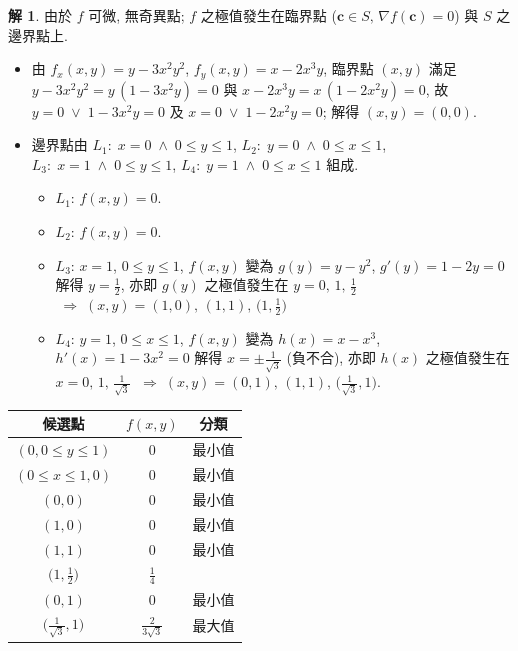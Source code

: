 \documentclass[12pt]{extarticle}
\newcommand{\ds}{\displaystyle}
\newcommand{\ie}{\;\Longrightarrow\;}
\newcommand{\orr}{\;\vee\;}
\newcommand{\andd}{\;\wedge\;}
\theoremstyle{definition}
\newtheorem*{sol}{解}
\newcommand{\vc}{\mathbf{c}}
\begin{document}
\begin{sol}
  由於 $f$ 可微, 無奇異點; $f$ 之極值發生在臨界點 ($\vc\in S,\,\nabla f(\vc) = 0$) 與 $S$ 之邊界點上. 
  \begin{itemize}\setlength\itemsep{0em}
    \item 由 $\ds f_x(x, y) = y - 3x^2y^2$, $\ds f_y(x, y) = x - 2x^3y$, 臨界點 $(x, y)$ 滿足 $\ds y - 3x^2y^2 = y\,(1 - 3x^2y) = 0$ 與 $\ds x - 2x^3y = x\,(1 - 2x^2y)= 0$, 故 $y = 0\orr 1 - 3x^2y = 0$ 及 $x = 0\orr 1 - 2x^2y = 0$; 解得 $(x, y) = (0, 0)$. 
    \item 邊界點由 $L_1:\;x = 0\andd 0\leqslant y\leqslant 1$, $L_2:\;y = 0\andd 0\leqslant x\leqslant 1$, $L_3:\;x = 1\andd 0\leqslant y\leqslant 1$, $L_4:\;y = 1\andd 0\leqslant x\leqslant 1$ 組成. 
      \begin{itemize}\setlength\itemsep{0em}
        \item $L_1$: $f(x, y) = 0$. 
        \item $L_2$: $f(x, y) = 0$. 
        \item $L_3$: $x = 1$, $0\leqslant y\leqslant1$, $f(x, y)$ 變為 $g(y) = y - y^2$, $g'(y) = 1 - 2y = 0$ 解得 $y = \frac{1}{2}$, 亦即 $g(y)$ 之極值發生在 $y = 0,\,1,\,\frac{1}{2}$ $\ie (x, y) = (1, 0),\,(1, 1),\,\big(1, \frac{1}{2}\big)$ 
        \item $L_4$: $y = 1$, $0\leqslant x\leqslant1$, $f(x, y)$ 變為 $h(x) = x - x^3$, $h'(x) = 1 - 3x^2 = 0$ 解得 $x = \pm\frac{1}{\sqrt{3}}$ (負不合), 亦即 $h(x)$ 之極值發生在 $x = 0,\,1,\,\frac{1}{\sqrt{3}}$ $\ie (x, y) = (0, 1),\,(1, 1),\,\big(\frac{1}{\sqrt{3}}, 1\big)$. 
      \end{itemize}
  \end{itemize}
  \begin{center}
  \renewcommand{\arraystretch}{1.3}
  \begin{tabular}{ccc}
    \toprule
    候選點 & $f(x, y)$ & 分類 \\    
    \midrule
    $(0, 0\leqslant y\leqslant 1)$ & $0$ & 最小值 \\
    $(0\leqslant x\leqslant 1, 0)$ & $0$ & 最小值 \\
    $(0, 0)$  & $0$ &  最小值 \\ 
    $(1, 0)$  & $0$ &  最小值 \\ 
    $(1, 1)$  & $0$ &  最小值 \\ 
    $\big(1, \frac{1}{2}\big)$  & $\frac{1}{4}$ &  \\ 
    $(0, 1)$  & $0$ &  最小值 \\ 
    $\big(\frac{1}{\sqrt{3}}, 1\big)$  & $\frac{2}{3\sqrt{3}}$ & 最大值 \\ 
    \bottomrule
  \end{tabular}
  \renewcommand{\arraystretch}{1.0}
  \end{center}
\end{sol}
\end{document}
